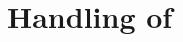 \documentclass[sigconf,natbib=false,review]{acmart}
\newcommand{\UnifRel}{\ensuremath{\simeq}}
\newcommand{\Ue}{\ensuremath{\UnifRel_\lambda}\xspace}
\begin{document}









\section{Handling of \maybeeta}\label{sec:eta}
\end{document}

